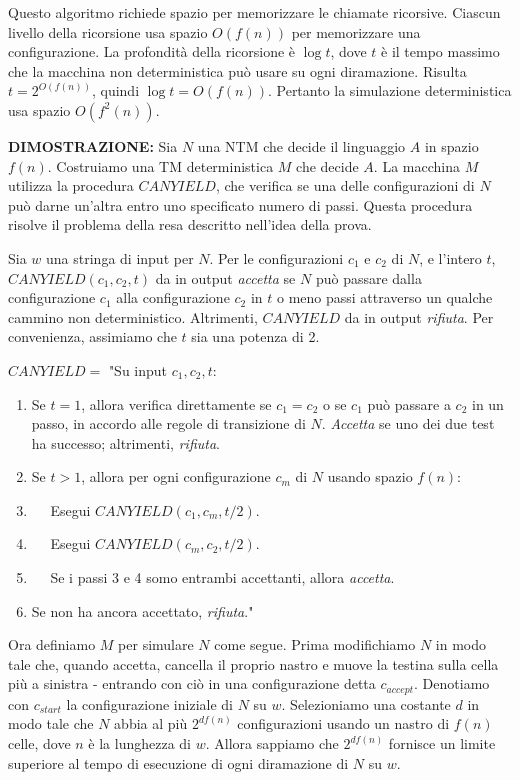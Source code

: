 \documentclass{article}
\begin{document}
Questo algoritmo richiede spazio per memorizzare le chiamate ricorsive. 
Ciascun livello della ricorsione usa spazio $O(f(n))$ per memorizzare una configurazione.
La profondità della ricorsione è $\log t$, dove $t$ è il tempo massimo che la macchina non deterministica può usare su ogni diramazione. 
Risulta $t = 2^{O(f(n))}$, quindi $\log t = O(f(n))$.
Pertanto la simulazione deterministica usa spazio $O(f^2(n))$.

\text{}
\newline
\textbf{DIMOSTRAZIONE:}
Sia $N$ una NTM che decide il linguaggio $A$ in spazio $f(n)$.
Costruiamo una TM deterministica $M$ che decide $A$.
La macchina $M$ utilizza la procedura $CANYIELD$, che verifica se una delle configurazioni di $N$ può darne un'altra entro uno specificato numero di passi.
Questa procedura risolve il problema della resa descritto nell'idea della prova.

Sia $w$ una stringa di input per $N$.
Per le configurazioni $c_1$ e $c_2$ di $N$, e l'intero $t$, $CANYIELD(c_1, c_2, t)$ da in output \textit{accetta} se $N$ può passare dalla configurazione $c_1$ alla configurazione $c_2$ in $t$ o meno passi attraverso un qualche cammino non deterministico.
Altrimenti, $CANYIELD$ da in output \textit{rifiuta}.
Per convenienza, assimiamo che $t$ sia una potenza di 2.

\text{}
\newline
$CANYIELD = $ "Su input $c_1, c_2, t$:
\begin{enumerate}
    \item Se $t = 1$, allora verifica direttamente se $c_1 = c_2$ o se $c_1$ può passare a $c_2$ in un passo, in accordo alle regole di transizione di $N$. \textit{Accetta} se uno dei due test ha successo; altrimenti, \textit{rifiuta}.
    \item Se $t > 1$, allora per ogni configurazione $c_m$ di $N$ usando spazio $f(n)$:
    \item $\quad$ Esegui $CANYIELD(c_1, c_m, t/2)$.
    \item $\quad$ Esegui $CANYIELD(c_m, c_2, t/2)$.
    \item $\quad$ Se i passi 3 e 4 somo entrambi accettanti, allora \textit{accetta}.
    \item Se non ha ancora accettato, \textit{rifiuta}."
\end{enumerate}

Ora definiamo $M$ per simulare $N$ come segue.
Prima modifichiamo $N$ in modo tale che, quando accetta, cancella il proprio nastro e muove la testina sulla cella più a sinistra - entrando con ciò in una configurazione detta $c_{accept}$. 
Denotiamo con $c_{start}$ la configurazione iniziale di $N$ su $w$.
Selezioniamo una costante $d$ in modo tale che $N$ abbia al più $2^{df(n)}$ configurazioni usando un nastro di $f(n)$ celle, dove $n$ è la lunghezza di $w$.
Allora sappiamo che $2^{df(n)}$ fornisce un limite superiore al tempo di esecuzione di ogni diramazione di $N$ su $w$.
    
\end{document}
